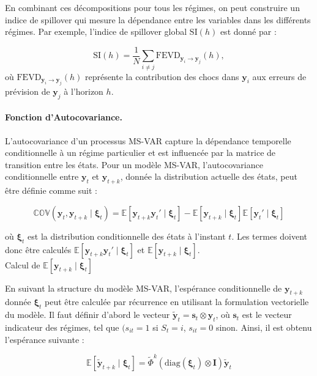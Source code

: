 \begin{sloppypar}
En combinant ces décompositions pour tous les régimes, on peut construire un indice de spillover qui mesure la dépendance entre les variables dans les différents régimes. Par exemple, l'indice de spillover global \( \text{SI}(h) \) est donné par :

\[
\text{SI}(h) = \frac{1}{N} \sum_{i \neq j} \text{FEVD}_{\bm{y}_i \to \bm{y}_j}(h),
\]
où \( \text{FEVD}_{\bm{y}_i \to \bm{y}_j}(h) \) représente la contribution des chocs dans \( \bm{y}_i \) aux erreurs de prévision de \( \bm{y}_j \) à l'horizon \( h \).

\paragraph{Fonction d'Autocovariance.} L'autocovariance d'un processus MS-VAR capture la dépendance temporelle conditionnelle à un régime particulier et est influencée par la matrice de transition entre les états. Pour un modèle MS-VAR, l’autocovariance conditionnelle entre \(\bm{y}_t\) et \(\bm{y}_{t+k}\), donnée la distribution actuelle des états, peut être définie comme suit :

\[
\mathbb{COV}(\bm{y}_t, \bm{y}_{t+k} \mid \boldsymbol{\xi}_t) = \mathbb{E}[\bm{y}_{t+k} \bm{y}_t' \mid \boldsymbol{\xi}_t] - \mathbb{E}[\bm{y}_{t+k} \mid \boldsymbol{\xi}_t] \mathbb{E}[\bm{y}_t' \mid \boldsymbol{\xi}_t]
\]

où \(\boldsymbol{\xi}_t\) est la distribution conditionnelle des états à l'instant \(t\). Les termes doivent donc être calculés \(\mathbb{E}[\mathbf{y}_{t+k} \mathbf{y}_t' \mid \boldsymbol{\xi}_t]\) et \(\mathbb{E}[\mathbf{y}_{t+k} \mid \boldsymbol{\xi}_t]\).
\\

Calcul de \(\mathbb{E}[\mathbf{y}_{t+k} \mid \boldsymbol{\xi}_t]\)

En suivant la structure du modèle MS-VAR, l'espérance conditionnelle de \(\mathbf{y}_{t+k}\) donnée \(\boldsymbol{\xi}_t\) peut être calculée par récurrence en utilisant la formulation vectorielle du modèle. Il faut définir d'abord le vecteur \(\tilde{\mathbf{y}}_t = \mathbf{s}_t \otimes \mathbf{y}_t\), où \(\mathbf{s}_t\) est le vecteur indicateur des régimes, tel que \((s_{it} = 1\) si \(S_t = i\), \(s_{it} = 0\) sinon. Ainsi, il est obtenu l'espérance suivante :

\[
\mathbb{E}[\tilde{\mathbf{y}}_{t+k} \mid \boldsymbol{\xi}_t] = \tilde{\Phi}^k \left( \text{diag}(\boldsymbol{\xi}_t) \otimes \mathbf{I} \right) \tilde{\mathbf{y}}_t
\]


\end{sloppypar}
